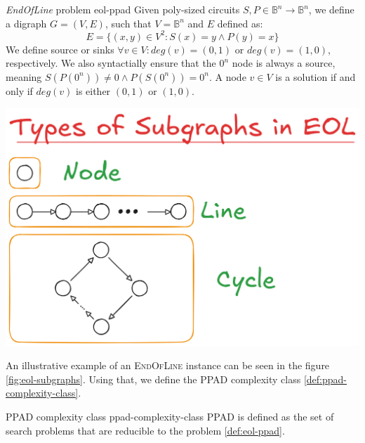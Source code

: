 \begin{minipage}{0.55\linewidth}
\begin{definitionbox}{\textit{EndOfLine} problem \cite{papadimitriou_ComplexityParityArgument_1994}}{eol-ppad}
    Given poly-sized circuits $S, P \in \mathbb{B}^n \to \mathbb{B}^n$,
    we define a digraph $G = (V,E)$, such that $V= \mathbb{B}^n$ and $E$ defined as:
    $$
    E = \{(x,y) \in V^2: S(x) = y \wedge P(y) = x\}
    $$
    We define source or sinks $\forall v \in V: \textit{deg}(v) = (0,1)$ or
    $\textit{deg}(v) = (1,0)$, respectively. 
    We also syntactially ensure that the $0^n$ node is always a source, meaning
    $S(P(0^n)) \neq 0 \wedge P(S(0^n)) = 0^n$.
    A node $v \in V$ is a solution if and only if $\textit{deg}(v)$ is either
    $(0,1)$  or $(1,0)$.
\end{definitionbox}
\end{minipage}
\begin{minipage}{0.45\linewidth}
    \centering
    \includegraphics[width=0.7\linewidth]{assets/eol-subgraphs.png}
    \label{fig:eol-subgraphs}
\end{minipage}

\vspace{0.2cm}

An illustrative example of an \textsc{EndOfLine} instance can be seen in the figure \ref{fig:eol-subgraphs}. 
Using that, we define the \textsc{PPAD} complexity class \ref{def:ppad-complexity-class}.


\begin{definitionbox}{\textsc{PPAD} complexity class \cite{papadimitriou_ComplexityParityArgument_1994}}{ppad-complexity-class}
    \textsc{PPAD} is defined as the set of search problems that
    are reducible to the  problem \ref{def:eol-ppad}.
\end{definitionbox}

